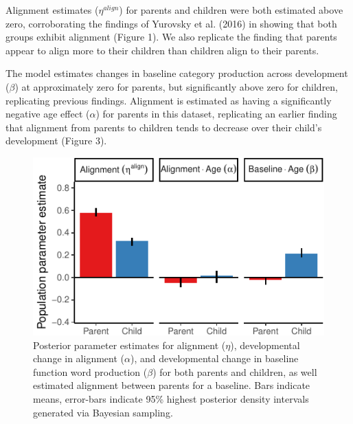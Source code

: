 \documentclass[10pt, letterpaper]{article}
\newenvironment{CodeChunk}{}{}
\begin{document}
Alignment estimates (\(\eta^{align}\)) for parents and children were
both estimated above zero, corroborating the findings of Yurovsky et al.
(2016) in showing that both groups exhibit alignment (Figure 1). We also
replicate the finding that parents appear to align more to their
children than children align to their parents.

The model estimates changes in baseline category production across
development (\(\beta\)) at approximately zero for parents, but
significantly above zero for children, replicating previous findings.
Alignment is estimated as having a significantly negative age effect
(\(\alpha\)) for parents in this dataset, replicating an earlier finding
that alignment from parents to children tends to decrease over their
child's development (Figure 3).

\begin{CodeChunk}
\begin{figure}[tb]
\includegraphics{figs/parameters_plot-1} \caption[Posterior parameter estimates for alignment ($\eta$), developmental change in alignment ($\alpha$), and developmental change in baseline function word production ($\beta$) for both parents and children, as well estimated alignment between parents for a baseline]{Posterior parameter estimates for alignment ($\eta$), developmental change in alignment ($\alpha$), and developmental change in baseline function word production ($\beta$) for both parents and children, as well estimated alignment between parents for a baseline. Bars indicate means, error-bars indicate 95\% highest posterior density intervals generated via Bayesian sampling.}\label{fig:parameters_plot}
\end{figure}
\end{CodeChunk}
\end{document}
